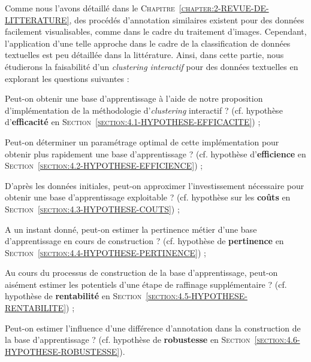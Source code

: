 	Comme nous l'avons détaillé dans le \textsc{Chapitre~\ref{chapter:2-REVUE-DE-LITTERATURE}}, des procédés d'annotation similaires existent pour des données facilement visualisables, comme dans le cadre du traitement d'images. Cependant, l'application d'une telle approche dans le cadre de la classification de données textuelles est peu détaillée dans la littérature. Ainsi, dans cette partie, nous étudierons la faisabilité d'un \textit{clustering interactif} pour des données textuelles en explorant les questions suivantes :
	\begin{leftBarImportantRed}
		\begin{todolist}
			\item Peut-on obtenir une base d'apprentissage à l'aide de notre proposition d'implémentation de la méthodologie d'\textit{clustering} interactif ? (cf. hypothèse d'\textbf{efficacité} en \textsc{Section~\ref{section:4.1-HYPOTHESE-EFFICACITE}}) ;
			\item Peut-on déterminer un paramétrage optimal de cette implémentation pour obtenir plus rapidement une base d'apprentissage ? (cf. hypothèse d'\textbf{efficience} en \textsc{Section~\ref{section:4.2-HYPOTHESE-EFFICIENCE}}) ;
			\item D'après les données initiales, peut-on approximer l'investissement nécessaire pour obtenir une base d'apprentissage exploitable ? (cf. hypothèse sur les \textbf{coûts} en \textsc{Section~\ref{section:4.3-HYPOTHESE-COUTS}}) ;
			\item A un instant donné, peut-on estimer la pertinence métier d'une base d'apprentissage en cours de construction ? (cf. hypothèse de \textbf{pertinence} en \textsc{Section~\ref{section:4.4-HYPOTHESE-PERTINENCE}}) ;
			\item Au cours du processus de construction de la base d'apprentissage, peut-on aisément estimer les potentiels d'une étape de raffinage supplémentaire ? (cf. hypothèse de \textbf{rentabilité} en \textsc{Section~\ref{section:4.5-HYPOTHESE-RENTABILITE}}) ;
			\item Peut-on estimer l'influence d'une différence d'annotation dans la construction de la base d'apprentissage ? (cf. hypothèse de \textbf{robustesse} en \textsc{Section~\ref{section:4.6-HYPOTHESE-ROBUSTESSE}}).
		\end{todolist}
	\end{leftBarImportantRed}
	
